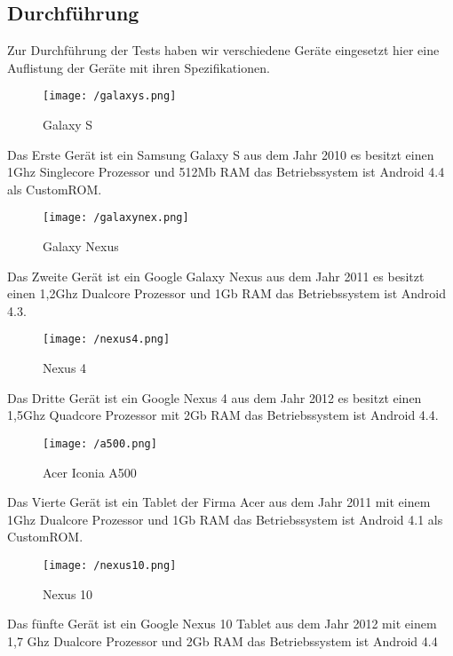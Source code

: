 \subsection{Durchführung} 

Zur Durchführung der Tests haben wir verschiedene Geräte eingesetzt hier eine Auflistung der Geräte mit ihren Spezifikationen.

\begin{figure}[H]
\centering
\texttt{[image: /galaxys.png]}
\caption{Galaxy S}
\label{fig:galaxy S}
\end{figure}

Das Erste Gerät ist ein Samsung Galaxy S aus dem Jahr 2010 es besitzt einen 1Ghz Singlecore Prozessor und 512Mb RAM das Betriebssystem ist Android 4.4 als CustomROM.\\

\begin{figure}[H]
\centering
\texttt{[image: /galaxynex.png]}
\caption{Galaxy Nexus}
\label{fig:galaxynex}
\end{figure}

Das Zweite Gerät ist ein Google Galaxy Nexus aus dem Jahr 2011 es besitzt einen 1,2Ghz Dualcore Prozessor und 1Gb RAM das Betriebssystem ist Android 4.3.\\

\begin{figure}[H]
\centering
\texttt{[image: /nexus4.png]}
\caption{Nexus 4}
\label{fig:nexus4}
\end{figure}

Das Dritte Gerät ist ein Google Nexus 4 aus dem Jahr 2012 es besitzt einen 1,5Ghz Quadcore Prozessor mit 2Gb RAM das Betriebssystem  ist Android 4.4.\\

\begin{figure}[H]
\centering
\texttt{[image: /a500.png]}
\caption{Acer Iconia A500}
\label{fig:a500}
\end{figure}

Das Vierte Gerät ist ein Tablet der Firma Acer aus dem Jahr 2011 mit einem 1Ghz Dualcore Prozessor und 1Gb RAM das Betriebssystem ist Android 4.1 als CustomROM.\\

\begin{figure}[H]
\centering
\texttt{[image: /nexus10.png]}
\caption{Nexus 10}
\label{fig:nexus10}
\end{figure}

Das fünfte Gerät ist ein Google Nexus 10 Tablet aus dem Jahr 2012 mit einem 1,7 Ghz Dualcore Prozessor und 2Gb RAM das Betriebssystem ist Android 4.4\\

